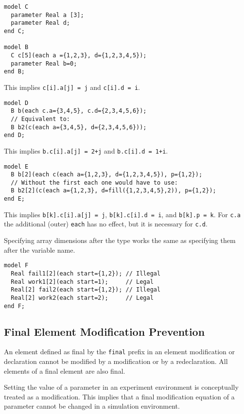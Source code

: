 \begin{example}
\begin{lstlisting}[language=modelica]
model C
  parameter Real a [3];
  parameter Real d;
end C;

model B
  C c[5](each a ={1,2,3}, d={1,2,3,4,5});
  parameter Real b=0;
end B;
\end{lstlisting}
This implies \lstinline!c[i].a[j] = j! and \lstinline!c[i].d = i!.

\begin{lstlisting}[language=modelica]
model D
  B b(each c.a={3,4,5}, c.d={2,3,4,5,6});
  // Equivalent to:
  B b2(c(each a={3,4,5}, d={2,3,4,5,6}));
end D;
\end{lstlisting}
This implies \lstinline!b.c[i].a[j] = 2+j! and \lstinline!b.c[i].d = 1+i!.
\begin{lstlisting}[language=modelica]
model E
  B b[2](each c(each a={1,2,3}, d={1,2,3,4,5}), p={1,2});
  // Without the first each one would have to use:
  B b2[2](c(each a={1,2,3}, d=fill({1,2,3,4,5},2)), p={1,2});
end E;
\end{lstlisting}
This implies \lstinline!b[k].c[i].a[j] = j!, \lstinline!b[k].c[i].d = i!, and \lstinline!b[k].p = k!.  For \lstinline!c.a! the additional (outer) \lstinline!each! has no effect,
but it is necessary for \lstinline!c.d!.

Specifying array dimensions after the type works the same as specifying them after the variable name.
\begin{lstlisting}[language=modelica]
model F
  Real fail1[2](each start={1,2}); // Illegal
  Real work1[2](each start=1);     // Legal
  Real[2] fail2(each start={1,2}); // Illegal
  Real[2] work2(each start=2);     // Legal
end F;
\end{lstlisting}
\end{example}

\subsection{Final Element Modification Prevention}\label{final-element-modification-prevention}

An element defined as final by the \lstinline!final! prefix in an element
modification or declaration cannot be modified by a modification or by a
redeclaration. All elements of a final element are also final.

\begin{nonnormative}
Setting the value of a parameter in an experiment environment is conceptually treated as a modification.  This implies that a final modification equation
of a parameter cannot be changed in a simulation environment.
\end{nonnormative}


